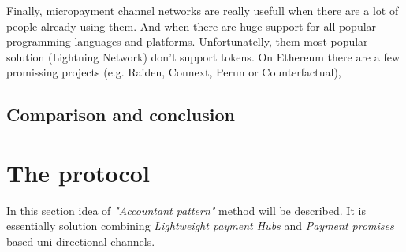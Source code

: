 \documentclass[a4paper,12pt]{article}
\begin{document}
Finally, micropayment channel networks are really usefull when there are a lot
of people already using them. And when there are huge support for all popular 
programming languages and platforms. Unfortunatelly, them most popular solution
(Lightning Network) don't support tokens. On Ethereum there are a few promissing
projects (e.g. Raiden, Connext, Perun or Counterfactual), 

\subsection{Comparison and conclusion}

\section{The protocol}

In this section idea of \textit{"Accountant pattern"} method will be described. 
It is essentially solution combining \textit{Lightweight payment Hubs} and 
\textit{Payment promises} based uni-directional channels.


\newpage
\printbibliography[heading=bibintoc]
\end{document}
